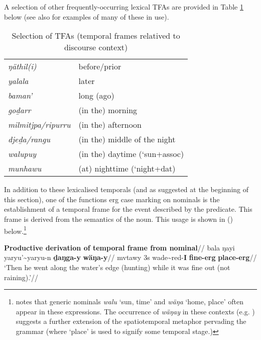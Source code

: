 A selection of other frequently-occurring lexical TFAs are provided in Table \ref{tfa-invent} below (see also \citealt[158-9]{Wilkinson1991} for examples of many of these in use).
\begin{table}[h]\centering
	\begin{tabular}{ll}
		\textit{ŋäthil(i)}	&	before/prior\\
		\textit{yalala}	&	later\\
		\textit{baman'}	&	long (ago)\\
		\textit{goḏarr}	&	(in the) morning\\
		\textit{milmitjpa/ripurru}	&	(in the) afternoon\\
		\textit{djeḏa/rangu}	& (in the) middle of the night\\
		\textit{walupuy}	& (in the) daytime (`sun+\gls{assoc})\\
		\textit{munhawu}	& (at) nighttime (`night+\gls{dat})\\
	\end{tabular}
	\caption{Selection of TFAs (temporal frames relatived to discourse context)}\label{tfa-invent}
\end{table}

In addition to these lexicalised temporals (and as suggested at the beginning of this section), one of the functions \gls{erg} case marking on nominals is the establishment of a temporal frame for the event described by the predicate. This frame is derived from the semantics of the noun. This usage is shown in () below.\footnote{\citet[585]{Wilkinson1991} notes that generic nominals \textit{walu} `sun, time' and \textit{wäŋa} `home, place' often appear in these expressions. The occurrence of \textit{wäŋay} in these contexts (e.g. ) suggests a further extension of the spatiotemporal metaphor pervading the grammar (where `place' is used to signify some temporal stage.)}

\pex{}\begingl\glpreamble\textbf{Productive derivation of temporal frame from nominal}//
\gla bala ŋayi yaryu'\textasciitilde{yaryu}-n \textbf{ḏaŋga-y} \textbf{wäŋa-y}//
\glb \gls{mvtawy} 3s wade\textasciitilde{\gls{red}}-\textbf{I} \textbf{fine-\gls{erg}} \textbf{place-\gls{erg}}//
	\glft`Then he went along the water's edge (hunting) while it was fine out (not raining).'//\endgl\xe


